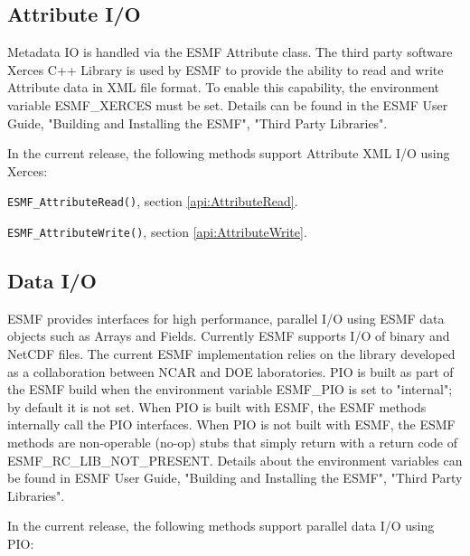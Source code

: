 \label{io:attributeio}
\subsection{Attribute I/O}

Metadata IO is handled via the ESMF Attribute class. The third
party software Xerces C++ Library is used by ESMF to provide
the ability to read and write Attribute data in XML file format.
To enable this capability, the environment variable ESMF\_XERCES must be
set. Details can be found in the ESMF User Guide, "Building and Installing the ESMF", "Third Party Libraries".

In the current release, the following methods support Attribute XML I/O using Xerces:

\begin{description}
\item {\tt ESMF\_AttributeRead()}, section \ref{api:AttributeRead}.
\item {\tt ESMF\_AttributeWrite()}, section \ref{api:AttributeWrite}.
\end{description}


\label{io:dataio}
\subsection{Data I/O}

ESMF provides interfaces for high performance, parallel I/O using ESMF data
objects such as Arrays and Fields.  Currently ESMF supports I/O of binary and
NetCDF files.  The current ESMF implementation relies on the 
 library developed as a collaboration between NCAR and DOE 
laboratories.  PIO is built as part of the ESMF build when the environment 
variable ESMF\_PIO is set to "internal"; by default it is not set.
When PIO is built with ESMF, the ESMF methods internally call the PIO 
interfaces.  When PIO is not built with ESMF, the ESMF methods are 
non-operable (no-op) stubs that simply return with a return code of
ESMF\_RC\_LIB\_NOT\_PRESENT.  Details about the environment variables can be 
found in ESMF User Guide, "Building and Installing the ESMF", 
"Third Party Libraries".

In the current release, the following methods support parallel data I/O using PIO:

